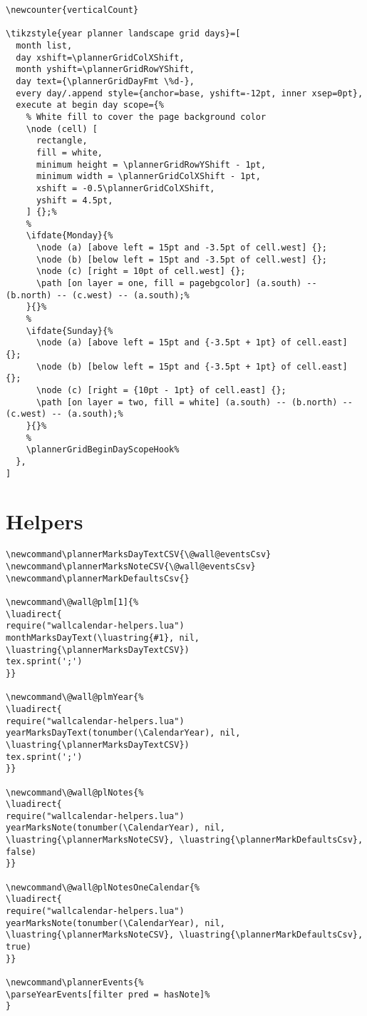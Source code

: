 \documentclass[11pt,oneside]{memoir-article}
\begin{document}
\begin{verbatim}
\newcounter{verticalCount}

\tikzstyle{year planner landscape grid days}=[
  month list,
  day xshift=\plannerGridColXShift,
  month yshift=\plannerGridRowYShift,
  day text={\plannerGridDayFmt \%d-},
  every day/.append style={anchor=base, yshift=-12pt, inner xsep=0pt},
  execute at begin day scope={%
    % White fill to cover the page background color
    \node (cell) [
      rectangle,
      fill = white,
      minimum height = \plannerGridRowYShift - 1pt,
      minimum width = \plannerGridColXShift - 1pt,
      xshift = -0.5\plannerGridColXShift,
      yshift = 4.5pt,
    ] {};%
    %
    \ifdate{Monday}{%
      \node (a) [above left = 15pt and -3.5pt of cell.west] {};
      \node (b) [below left = 15pt and -3.5pt of cell.west] {};
      \node (c) [right = 10pt of cell.west] {};
      \path [on layer = one, fill = pagebgcolor] (a.south) -- (b.north) -- (c.west) -- (a.south);%
    }{}%
    %
    \ifdate{Sunday}{%
      \node (a) [above left = 15pt and {-3.5pt + 1pt} of cell.east] {};
      \node (b) [below left = 15pt and {-3.5pt + 1pt} of cell.east] {};
      \node (c) [right = {10pt - 1pt} of cell.east] {};
      \path [on layer = two, fill = white] (a.south) -- (b.north) -- (c.west) -- (a.south);%
    }{}%
    %
    \plannerGridBeginDayScopeHook%
  },
]
\end{verbatim}
\section{Helpers}
\label{sec:orgdfb1023}

\begin{verbatim}
\newcommand\plannerMarksDayTextCSV{\@wall@eventsCsv}
\newcommand\plannerMarksNoteCSV{\@wall@eventsCsv}
\newcommand\plannerMarkDefaultsCsv{}

\newcommand\@wall@plm[1]{%
\luadirect{
require("wallcalendar-helpers.lua")
monthMarksDayText(\luastring{#1}, nil, \luastring{\plannerMarksDayTextCSV})
tex.sprint(';')
}}

\newcommand\@wall@plmYear{%
\luadirect{
require("wallcalendar-helpers.lua")
yearMarksDayText(tonumber(\CalendarYear), nil, \luastring{\plannerMarksDayTextCSV})
tex.sprint(';')
}}

\newcommand\@wall@plNotes{%
\luadirect{
require("wallcalendar-helpers.lua")
yearMarksNote(tonumber(\CalendarYear), nil, \luastring{\plannerMarksNoteCSV}, \luastring{\plannerMarkDefaultsCsv}, false)
}}

\newcommand\@wall@plNotesOneCalendar{%
\luadirect{
require("wallcalendar-helpers.lua")
yearMarksNote(tonumber(\CalendarYear), nil, \luastring{\plannerMarksNoteCSV}, \luastring{\plannerMarkDefaultsCsv}, true)
}}

\newcommand\plannerEvents{%
\parseYearEvents[filter pred = hasNote]%
}

\end{verbatim}
\end{document}
